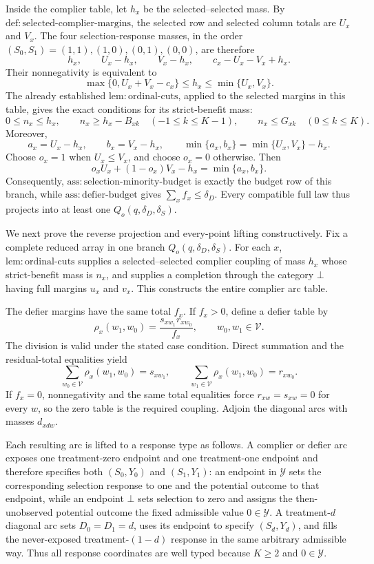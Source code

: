 Inside the complier table, let \(h_x\) be the selected--selected mass.  By \(\mathrm{def:selected\text{-}complier\text{-}margins}\), the selected row and selected column totals are \(U_x\) and \(V_x\).  The four selection-response masses, in the order \((S_0,S_1)=(1,1),(1,0),(0,1),(0,0)\), are therefore
\[
 h_x,
 \qquad U_x-h_x,
 \qquad V_x-h_x,
 \qquad c_x-U_x-V_x+h_x.
\]
Their nonnegativity is equivalent to
\[
 \max\{0,U_x+V_x-c_x\}
 \leq h_x\leq\min\{U_x,V_x\}.
\]
The already established \(\mathrm{lem:ordinal\text{-}cuts}\), applied to the selected margins in this table, gives the exact conditions for its strict-benefit mass:
\[
 0\leq n_x\leq h_x,
 \qquad
 n_x\geq h_x-B_{xk}\quad(-1\leq k\leq K-1),
 \qquad
 n_x\leq G_{xk}\quad(0\leq k\leq K).
\]
Moreover,
\[
 a_x=U_x-h_x,
 \qquad
 b_x=V_x-h_x,
 \qquad
 \min\{a_x,b_x\}=\min\{U_x,V_x\}-h_x.
\]
Choose \(o_x=1\) when \(U_x\leq V_x\), and choose \(o_x=0\) otherwise.  Then
\[
 o_xU_x+(1-o_x)V_x-h_x=\min\{a_x,b_x\}.
\]
Consequently, \(\mathrm{ass:selection\text{-}minority\text{-}budget}\) is exactly the budget row of this branch, while \(\mathrm{ass:defier\text{-}budget}\) gives \(\sum_x f_x\leq\delta_D\).  Every compatible full law thus projects into at least one \(Q_o(q,\delta_D,\delta_S)\).

We next prove the reverse projection and every-point lifting constructively.  Fix a complete reduced array in one branch \(Q_o(q,\delta_D,\delta_S)\).  For each \(x\), \(\mathrm{lem:ordinal\text{-}cuts}\) supplies a selected--selected complier coupling of mass \(h_x\) whose strict-benefit mass is \(n_x\), and supplies a completion through the category \(\bot\) having full margins \(u_x\) and \(v_x\).  This constructs the entire complier arc table.

The defier margins have the same total \(f_x\).  If \(f_x>0\), define a defier table by
\[
 \rho_x(w_1,w_0)=\frac{s_{xw_1}r_{xw_0}}{f_x},
 \qquad w_0,w_1\in\mathcal V.
\]
The division is valid under the stated case condition.  Direct summation and the residual-total equalities yield
\[
 \sum_{w_0\in\mathcal V}\rho_x(w_1,w_0)=s_{xw_1},
 \qquad
 \sum_{w_1\in\mathcal V}\rho_x(w_1,w_0)=r_{xw_0}.
\]
If \(f_x=0\), nonnegativity and the same total equalities force \(r_{xw}=s_{xw}=0\) for every \(w\), so the zero table is the required coupling.  Adjoin the diagonal arcs with masses \(d_{xdw}\).

Each resulting arc is lifted to a response type as follows.  A complier or defier arc exposes one treatment-zero endpoint and one treatment-one endpoint and therefore specifies both \((S_0,Y_0)\) and \((S_1,Y_1)\): an endpoint in \(\mathcal Y\) sets the corresponding selection response to one and the potential outcome to that endpoint, while an endpoint \(\bot\) sets selection to zero and assigns the then-unobserved potential outcome the fixed admissible value \(0\in\mathcal Y\).  A treatment-\(d\) diagonal arc sets \(D_0=D_1=d\), uses its endpoint to specify \((S_d,Y_d)\), and fills the never-exposed treatment-\((1-d)\) response in the same arbitrary admissible way.  Thus all response coordinates are well typed because \(K\geq2\) and \(0\in\mathcal Y\).

